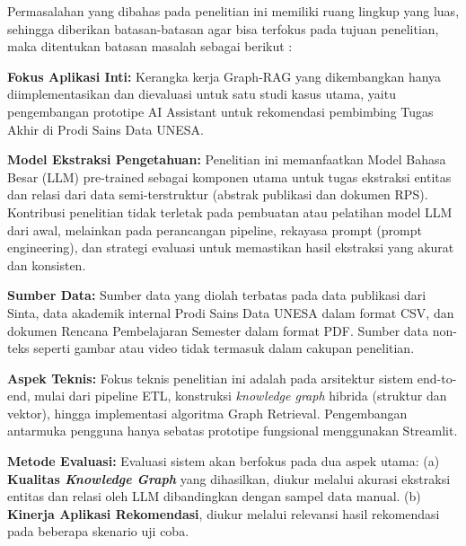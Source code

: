 Permasalahan yang dibahas pada penelitian ini memiliki ruang lingkup yang luas, sehingga diberikan batasan-batasan agar bisa terfokus pada tujuan penelitian, maka ditentukan batasan masalah sebagai berikut :
\begin{packed_item}
	\item \textbf{Fokus Aplikasi Inti:} Kerangka kerja Graph-RAG yang dikembangkan hanya diimplementasikan dan dievaluasi untuk satu studi kasus utama, yaitu pengembangan prototipe AI Assistant untuk rekomendasi pembimbing Tugas Akhir di Prodi Sains Data UNESA.
	
	\item \textbf{Model Ekstraksi Pengetahuan:} Penelitian ini memanfaatkan Model Bahasa Besar (LLM) pre-trained sebagai komponen utama untuk tugas ekstraksi entitas dan relasi dari data semi-terstruktur (abstrak publikasi dan dokumen RPS). Kontribusi penelitian tidak terletak pada pembuatan atau pelatihan model LLM dari awal, melainkan pada perancangan pipeline, rekayasa prompt (prompt engineering), dan strategi evaluasi untuk memastikan hasil ekstraksi yang akurat dan konsisten.
	
	\item \textbf{Sumber Data:} Sumber data yang diolah terbatas pada data publikasi dari Sinta, data akademik internal Prodi Sains Data UNESA dalam format CSV, dan dokumen Rencana Pembelajaran Semester dalam format PDF. Sumber data non-teks seperti gambar atau video tidak termasuk dalam cakupan penelitian.
	
	\item \textbf{Aspek Teknis:} Fokus teknis penelitian ini adalah pada arsitektur sistem end-to-end, mulai dari pipeline ETL, konstruksi \textit{knowledge graph} hibrida (struktur dan vektor), hingga implementasi algoritma Graph Retrieval. Pengembangan antarmuka pengguna hanya sebatas prototipe fungsional menggunakan Streamlit.
	
	\item \textbf{Metode Evaluasi:} Evaluasi sistem akan berfokus pada dua aspek utama: (a) \textbf{Kualitas \textit{Knowledge Graph}} yang dihasilkan, diukur melalui akurasi ekstraksi entitas dan relasi oleh LLM dibandingkan dengan sampel data manual. (b) \textbf{Kinerja Aplikasi Rekomendasi}, diukur melalui relevansi hasil rekomendasi pada beberapa skenario uji coba.
\end{packed_item}

